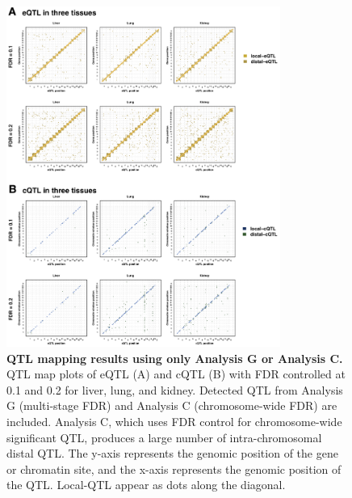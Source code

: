 \documentclass[9pt,twocolumn,twoside]{gsajnl}
\begin{document}
\clearpage

\begin{figure}[hp]
\renewcommand{\familydefault}{\sfdefault}\normalfont
\centering
\includegraphics[width=0.8\textwidth, trim={0in 0in 0in 0in}, clip]{figs/qtl_map_supplemental.png}
\caption{\textbf{QTL mapping results using only Analysis G or Analysis C.} 
QTL map plots of eQTL (A) and cQTL (B) with FDR controlled at 0.1 and 0.2 for liver, lung, and kidney. Detected QTL from Analysis G (multi-stage FDR) and Analysis C (chromosome-wide FDR) are included. Analysis C, which uses FDR control for chromosome-wide significant QTL, produces a large number of intra-chromosomal distal QTL. The y-axis represents the genomic position of the gene or chromatin site, and the x-axis represents the genomic position of the QTL. Local-QTL appear as dots along the diagonal.
\label{fig:grid_fdr_plot}}
\end{figure}

\clearpage
\end{document}
